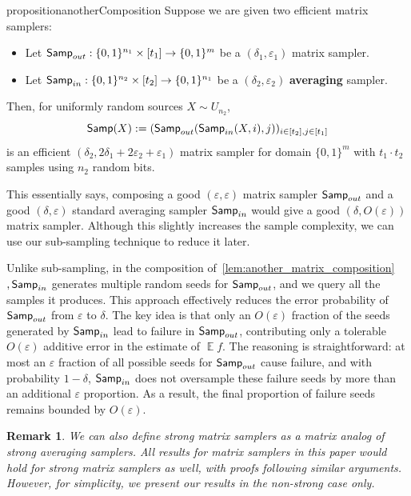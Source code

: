 \documentclass[11pt,letterpaper]{article}
\newtheorem{remark}[theorem]{Remark}
\DeclareMathOperator*{\E}{\mathbb{E}}
\newcommand{\eps}{\varepsilon}
\newcommand{\1}{\mathbbm{1}}
\newcommand{\zo}{\{0, 1\}}
\newcommand{\Smp}{\textup{\textsf{Samp}}}
\begin{document}
\begin{restatable}{proposition}{anotherComposition}
\label{lem:another_matrix_composition}
    Suppose we are given two efficient matrix samplers:
\begin{itemize}
    \item  Let $\Smp_{out}: \zo^{n_1} \times [t_1] \to \zo^m$ be a $(\delta_1, \eps_1)$ matrix sampler.
    \item Let $\Smp_{in}: \zo^{n_2} \times [t_2] \to \zo^{n_1}$ be a $(\delta_2, \eps_2)$ \textbf{averaging} sampler.
\end{itemize}
 Then, for uniformly random sources  $X \sim U_{n_2}$, \[
        \Smp(X):= (\Smp_{out}(\Smp_{in}(X, i), j))_{i \in [t_2], j \in [t_1]}
    \]
    is an efficient $(\delta_2, 2\delta_1 + 2\eps_2 + \eps_1)$ matrix sampler for domain $\zo^m$ with $t_1 \cdot t_2$ samples using $n_2$ random bits. 
\end{restatable}

This essentially says, composing a good $(\eps, \eps)$ matrix sampler $\Smp_{out}$ and a good $(\delta, \eps)$ standard averaging sampler $\Smp_{in}$ would give a  good $(\delta, O(\eps))$ matrix sampler. Although this slightly increases the sample complexity, we can use our sub-sampling technique to reduce it later.

Unlike sub-sampling, in the composition of~\cref{lem:another_matrix_composition}$, \Smp_{in}$ generates multiple random seeds for $\Smp_{out}$, and we query all the samples it produces. This approach effectively reduces the error probability of $\Smp_{out}$ from $\eps$ to $\delta$. The key idea is that only an \(O(\eps)\) fraction of the seeds generated by \(\Smp_{in}\) lead to failure in \(\Smp_{out}\), contributing only a tolerable \(O(\eps)\) additive error in the estimate of \(\E f\).  The reasoning is straightforward: at most an \(\eps\) fraction of all possible seeds for \(\Smp_{out}\) cause failure, and with probability \(1 - \delta\), \(\Smp_{in}\) does not oversample these failure seeds by more than an additional \(\eps\) proportion. As a result, the final proportion of failure seeds remains bounded by \(O(\eps)\).






\begin{remark}
We can also define \emph{strong matrix samplers} as a matrix analog of strong averaging samplers. All results for matrix samplers in this paper would hold for strong matrix samplers as well, with proofs following similar arguments. However, for simplicity, we present our results in the non-strong case only.
\end{remark}
\end{document}
